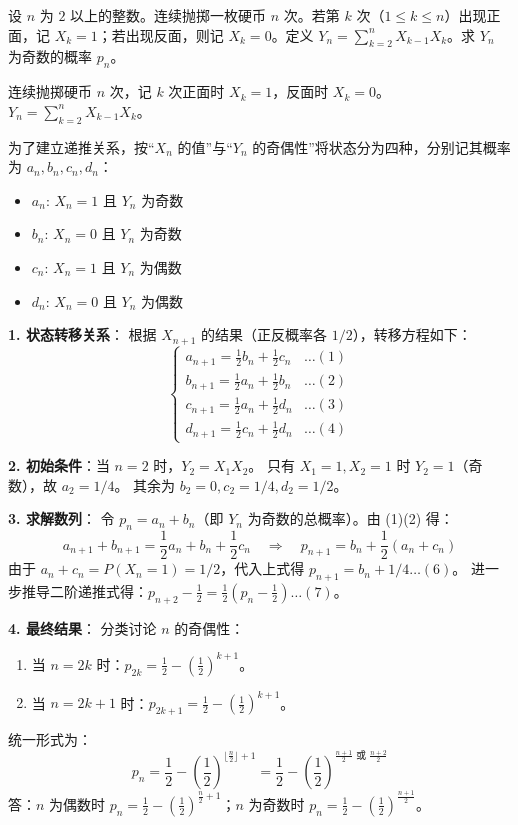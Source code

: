 \begin{questions}
\question
设 $n$ 为 $2$ 以上的整数。连续抛掷一枚硬币 $n$ 次。若第 $k$ 次（$1 \le k \le n$）出现正面，记 $X_k = 1$；若出现反面，则记 $X_k = 0$。定义 $Y_n = \sum_{k=2}^{n} X_{k-1}X_k$。求 $Y_n$ 为奇数的概率 $p_n$。

\begin{solution}
    连续抛掷硬币 $n$ 次，记 $k$ 次正面时 $X_k=1$，反面时 $X_k=0$。$Y_n = \sum_{k=2}^{n} X_{k-1}X_k$。
    
    为了建立递推关系，按“$X_n$ 的值”与“$Y_n$ 的奇偶性”将状态分为四种，分别记其概率为 $a_n, b_n, c_n, d_n$：
    \begin{itemize}
        \item $a_n$: $X_n=1$ 且 $Y_n$ 为奇数
        \item $b_n$: $X_n=0$ 且 $Y_n$ 为奇数
        \item $c_n$: $X_n=1$ 且 $Y_n$ 为偶数
        \item $d_n$: $X_n=0$ 且 $Y_n$ 为偶数
    \end{itemize}

    \textbf{1. 状态转移关系}：
    根据 $X_{n+1}$ 的结果（正反概率各 $1/2$），转移方程如下：
    \[ \begin{cases} 
    a_{n+1} = \frac{1}{2}b_n + \frac{1}{2}c_n & \dots (1) \\
    b_{n+1} = \frac{1}{2}a_n + \frac{1}{2}b_n & \dots (2) \\
    c_{n+1} = \frac{1}{2}a_n + \frac{1}{2}d_n & \dots (3) \\
    d_{n+1} = \frac{1}{2}c_n + \frac{1}{2}d_n & \dots (4)
    \end{cases}  \]
    
    
    \textbf{2. 初始条件}：当 $n=2$ 时，$Y_2 = X_1 X_2$。
    只有 $X_1=1, X_2=1$ 时 $Y_2=1$（奇数），故 $a_2 = 1/4$。
    其余为 $b_2 = 0, c_2 = 1/4, d_2 = 1/2$。

    \textbf{3. 求解数列}：
    令 $p_n = a_n + b_n$（即 $Y_n$ 为奇数的总概率）。由 (1)(2) 得：
    \[ a_{n+1} + b_{n+1} = \frac{1}{2}a_n + b_n + \frac{1}{2}c_n \quad \Rightarrow \quad p_{n+1} = b_n + \frac{1}{2}(a_n + c_n)  \]
    由于 $a_n + c_n = P(X_n=1) = 1/2$，代入上式得 $p_{n+1} = b_n + 1/4 \dots (6)$。
    进一步推导二阶递推式得：$p_{n+2} - \frac{1}{2} = \frac{1}{2}(p_n - \frac{1}{2}) \dots (7)$。

    \textbf{4. 最终结果}：
    分类讨论 $n$ 的奇偶性：
    \begin{enumerate}[label=(\roman*)]
        \item 当 $n=2k$ 时：$p_{2k} = \frac{1}{2} - \left(\frac{1}{2}\right)^{k+1}$。
        \item 当 $n=2k+1$ 时：$p_{2k+1} = \frac{1}{2} - \left(\frac{1}{2}\right)^{k+1}$。
    \end{enumerate}
    统一形式为：
    \[ p_n = \frac{1}{2} - \left(\frac{1}{2}\right)^{\lfloor \frac{n}{2} \rfloor + 1} = \frac{1}{2} - \left(\frac{1}{2}\right)^{\frac{n+1}{2} \text{ 或 } \frac{n+2}{2}}  \]
    答：$n$ 为偶数时 $p_n = \frac{1}{2} - \left(\frac{1}{2}\right)^{\frac{n}{2}+1}$；$n$ 为奇数时 $p_n = \frac{1}{2} - \left(\frac{1}{2}\right)^{\frac{n+1}{2}}$。
\end{solution}


\end{questions}
